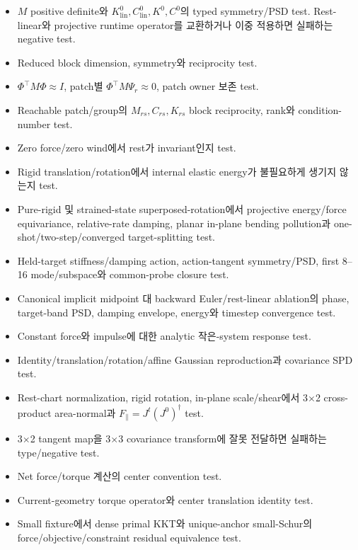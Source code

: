 \documentclass[10pt,a4paper]{article}
\newcommand{\todo}{\textcolor{TodoGray}{\(\square\)}}
\begin{document}
\begin{itemize}
  \item[\todo] \(M\) positive definite와
  \(K_{\mathrm{lin}}^0,C_{\mathrm{lin}}^0,K^0,C^0\)의 typed symmetry/PSD test.
  Rest-linear와 projective runtime operator를 교환하거나 이중 적용하면 실패하는 negative test.
  \item[\todo] Reduced block dimension, symmetry와 reciprocity test.
  \item[\todo] \(\Phi^\top M\Phi\approx I\), patch별 \(\Phi^\top M\Psi_r\approx0\), patch owner 보존 test.
  \item[\todo] Reachable patch/group의 \(M_{rs},C_{rs},K_{rs}\) block reciprocity, rank와 condition-number test.
  \item[\todo] Zero force/zero wind에서 rest가 invariant인지 test.
  \item[\todo] Rigid translation/rotation에서 internal elastic energy가 불필요하게 생기지 않는지 test.
  \item[\todo] Pure-rigid 및 strained-state superposed-rotation에서 projective energy/force equivariance,
  relative-rate damping, planar in-plane bending pollution과 one-shot/two-step/converged target-splitting test.
  \item[\todo] Held-target stiffness/damping action, action-tangent symmetry/PSD,
  first 8--16 mode/subspace와 common-probe closure test.
  \item[\todo] Canonical implicit midpoint 대 backward Euler/rest-linear ablation의 phase,
  target-band PSD, damping envelope, energy와 timestep convergence test.
  \item[\todo] Constant force와 impulse에 대한 analytic 작은-system response test.
  \item[\todo] Identity/translation/rotation/affine Gaussian reproduction과 covariance SPD test.
  \item[\todo] Rest-chart normalization, rigid rotation, in-plane scale/shear에서 3\(\times\)2 cross-product area-normal과 \(F_\parallel=J^t(J^0)^\dagger\) test.
  \item[\todo] 3\(\times\)2 tangent map을 3\(\times\)3 covariance transform에 잘못 전달하면 실패하는 type/negative test.
  \item[\todo] Net force/torque 계산의 center convention test.
  \item[\todo] Current-geometry torque operator와 center translation identity test.
  \item[\todo] Small fixture에서 dense primal KKT와 unique-anchor small-Schur의 force/objective/constraint residual equivalence test.

\end{itemize}
\end{document}
